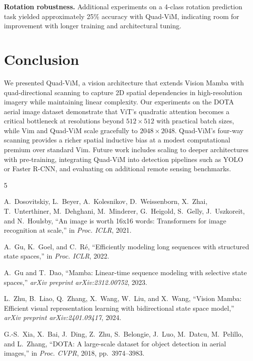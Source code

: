 \documentclass[conference]{IEEEtran}
\begin{document}
\textbf{Rotation robustness.} Additional experiments on a 4-class rotation prediction task yielded approximately 25\% accuracy with Quad-ViM, indicating room for improvement with longer training and architectural tuning.

\section{Conclusion}

We presented Quad-ViM, a vision architecture that extends Vision Mamba with quad-directional scanning to capture 2D spatial dependencies in high-resolution imagery while maintaining linear complexity. Our experiments on the DOTA aerial image dataset demonstrate that ViT's quadratic attention becomes a critical bottleneck at resolutions beyond $512 \times 512$ with practical batch sizes, while Vim and Quad-ViM scale gracefully to $2048 \times 2048$. Quad-ViM's four-way scanning provides a richer spatial inductive bias at a modest computational premium over standard Vim. Future work includes scaling to deeper architectures with pre-training, integrating Quad-ViM into detection pipelines such as YOLO or Faster R-CNN, and evaluating on additional remote sensing benchmarks.


\begin{thebibliography}{5}

A.~Dosovitskiy, L.~Beyer, A.~Kolesnikov, D.~Weissenborn, X.~Zhai, T.~Unterthiner, M.~Dehghani, M.~Minderer, G.~Heigold, S.~Gelly, J.~Uszkoreit, and N.~Houlsby,
``An image is worth 16x16 words: Transformers for image recognition at scale,''
in \textit{Proc. ICLR}, 2021.

A.~Gu, K.~Goel, and C.~R\'{e},
``Efficiently modeling long sequences with structured state spaces,''
in \textit{Proc. ICLR}, 2022.

A.~Gu and T.~Dao,
``Mamba: Linear-time sequence modeling with selective state spaces,''
\textit{arXiv preprint arXiv:2312.00752}, 2023.

L.~Zhu, B.~Liao, Q.~Zhang, X.~Wang, W.~Liu, and X.~Wang,
``Vision Mamba: Efficient visual representation learning with bidirectional state space model,''
\textit{arXiv preprint arXiv:2401.09417}, 2024.

G.-S.~Xia, X.~Bai, J.~Ding, Z.~Zhu, S.~Belongie, J.~Luo, M.~Datcu, M.~Pelillo, and L.~Zhang,
``DOTA: A large-scale dataset for object detection in aerial images,''
in \textit{Proc. CVPR}, 2018, pp.~3974--3983.

\end{thebibliography}
\end{document}
